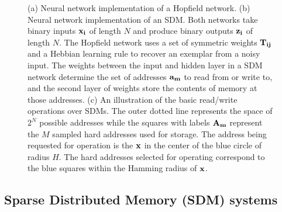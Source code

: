 \documentclass[10pt,letterpaper]{article}
\begin{document}
\begin{center}
\begin{figure}[h!]
\caption{(a) Neural network implementation of a Hopfield network. (b) Neural network implementation of an SDM. Both networks take binary inputs $\bf{x}_{i}$ of length $N$ and produce binary outputs $\bf{z}_{i}$ of length $N$. The Hopfield network uses a set of symmetric weights $\bf{T}_{ij}$ and a Hebbian learning rule to recover an exemplar from a noisy input. The weights between the input and hidden layer in a SDM network determine the set of addresses $\bf{a}_{m}$ to read from or write to, and the second layer of weights store the contents of memory at those addresses. (c) An illustration of the basic read/write operations over SDMs. The outer dotted line represents the space of $2^{N}$ possible addresses while the squares with labels $\bf{A}_{m}$ represent the $M$ sampled hard addresses used for storage. The address being requested for operation is the $\bf{x}$ in the center of the blue circle of radius $H$. The hard addresses selected for operating correspond to the blue squares within the Hamming radius of $\bf{x}$.}
\label{neuralNets}
\end{figure}
\end{center}


\subsection{Sparse Distributed Memory (SDM) systems}
\end{document}
